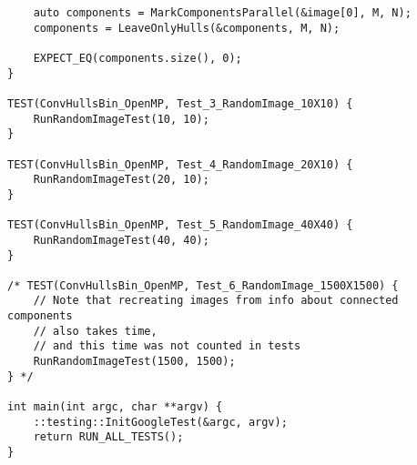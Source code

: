 \documentclass[14pt, russian]{extarticle}
\begin{document}
\begin{lstlisting}
	auto components = MarkComponentsParallel(&image[0], M, N);
	components = LeaveOnlyHulls(&components, M, N);
	
	EXPECT_EQ(components.size(), 0);
}

TEST(ConvHullsBin_OpenMP, Test_3_RandomImage_10X10) {
	RunRandomImageTest(10, 10);
}

TEST(ConvHullsBin_OpenMP, Test_4_RandomImage_20X10) {
	RunRandomImageTest(20, 10);
}

TEST(ConvHullsBin_OpenMP, Test_5_RandomImage_40X40) {
	RunRandomImageTest(40, 40);
}

/* TEST(ConvHullsBin_OpenMP, Test_6_RandomImage_1500X1500) {
	// Note that recreating images from info about connected components
	// also takes time,
	// and this time was not counted in tests
	RunRandomImageTest(1500, 1500);
} */

int main(int argc, char **argv) {
	::testing::InitGoogleTest(&argc, argv);
	return RUN_ALL_TESTS();
}
	\end{lstlisting}
	\newpage
	
\end{document}
